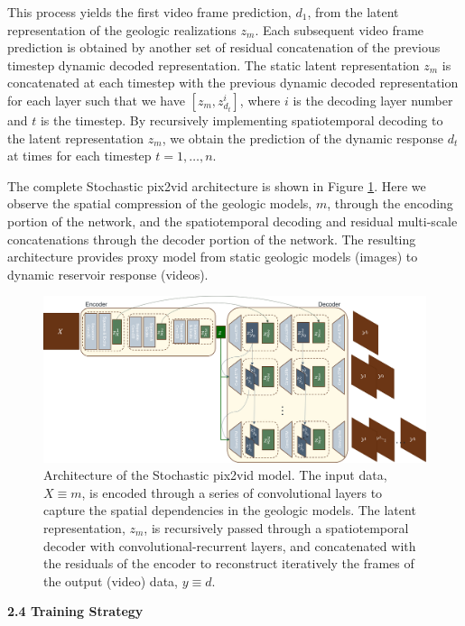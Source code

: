 \documentclass[10pt, twoside]{article}
\begin{document}
This process yields the first video frame prediction, $d_1$, from the latent representation of the geologic realizations $z_m$. Each subsequent video frame prediction is obtained by another set of residual concatenation of the previous timestep dynamic decoded representation. The static latent representation $z_m$ is concatenated at each timestep with the previous dynamic decoded representation for each layer such that we have $[z_m,z_{d_t}^i]$, where $i$ is the decoding layer number and $t$ is the timestep. By recursively implementing spatiotemporal decoding to the latent representation $z_m$, we obtain the prediction of the dynamic response $d_t$ at times for each timestep $t=1,\ldots,n$.

The complete Stochastic pix2vid architecture is shown in Figure \ref{cnnrnn_architecture}. Here we observe the spatial compression of the geologic models, $m$, through the encoding portion of the network, and the spatiotemporal decoding and residual multi-scale concatenations through the decoder portion of the network. The resulting architecture provides proxy model from static geologic models (images) to dynamic reservoir response (videos).

\begin{figure}[t]
    \centering
    \includegraphics[width=16cm]{figures/architecture.png}
    \caption{Architecture of the Stochastic pix2vid model. The input data, $X\equiv m$, is encoded through a series of convolutional layers to capture the spatial dependencies in the geologic models. The latent representation, $z_m$, is recursively passed through a spatiotemporal decoder with convolutional-recurrent layers, and concatenated with the residuals of the encoder to reconstruct iteratively the frames of the output (video) data, $y\equiv d$.}
    \label{cnnrnn_architecture}
\end{figure}


\textbf{2.4 Training Strategy} 
\end{document}
